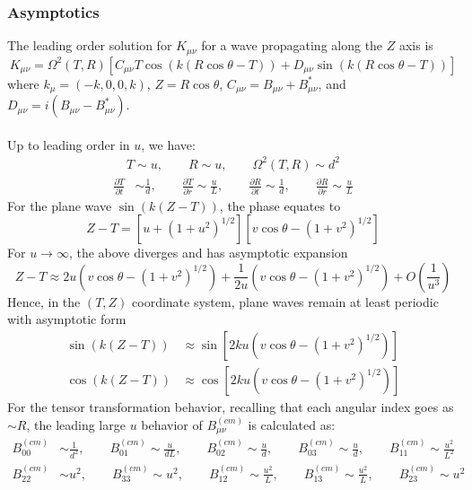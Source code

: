 \documentclass[10pt,letterpaper]{article}
\begin{document}
\subsubsection*{Asymptotics}
The leading order solution for $K_{\mu\nu}$ for a wave propagating along the $Z$ axis is
\begin{equation}
K_{\mu\nu} = \Omega^2(T,R)\left[ C_{\mu\nu} T \cos(k(R\cos\theta - T)) + D_{\mu\nu} \sin(k(R\cos\theta - T)) \right]
\end{equation}
where $k_{\mu} = (-k,0,0,k)$, $Z = R\cos\theta$, $C_{\mu\nu} = B_{\mu\nu}+B^*_{\mu\nu} $, and $D_{\mu\nu} = i(B_{\mu\nu}-B^*_{\mu\nu})$.
\\ \\
Up to leading order in $u$, we have:
\begin{align}
T\sim u,\qquad R \sim u,\qquad \Omega^2(T,R) \sim d^2
\end{align}
\begin{align}
\frac{\partial T}{\partial t} & \sim \frac{1}{d},\qquad
\frac{\partial T}{\partial r}  \sim 	\frac{u}{L},\qquad
\frac{\partial R}{\partial t}  \sim \frac{1}{d},\qquad
\frac{\partial R}{\partial r}  \sim \frac{u}{L}
\end{align}
For the plane wave $\sin(k(Z-T))$, the phase equates to
\begin{equation}
Z-T = \left[u+(1+u^2)^{1/2}\right]\left[v\cos\theta - ( 1+v^2)^{1/2}\right]
\end{equation}
For $u \to \infty$, the above diverges and has asymptotic expansion
\begin{equation}
Z-T \approx 2 u \left( v\cos\theta - (1+v^2)^{1/2}\right) + \frac{1}{2u}\left( v\cos\theta - (1+v^2)^{1/2}\right) + O\left( \frac{1}{u^3}\right)
\end{equation}
Hence, in the $(T,Z)$ coordinate system, plane waves remain at least periodic with asymptotic form
\begin{align}
\sin(k(Z-T)) &\approx \sin\left[ 2 k u \left( v\cos\theta - (1+v^2)^{1/2}\right)\right]\nonumber\\
\cos(k(Z-T)) &\approx \cos\left[ 2 k u \left( v\cos\theta - (1+v^2)^{1/2}\right)\right]
\end{align}
For the tensor transformation behavior, recalling that each angular index goes as $\sim R$, the leading large $u$ behavior of $B_{\mu\nu}^{(cm)}$ is calculated as:
\begin{align}
B^{(cm)}_{00} &\sim \frac{1}{d^2},\qquad 
B^{(cm)}_{01} \sim \frac{u}{dL},\qquad 
B^{(cm)}_{02} \sim \frac{u}{d},\qquad 
B^{(cm)}_{03} \sim \frac{u}{d} ,\qquad 
B^{(cm)}_{11} \sim \frac{u^2}{L^2} \nonumber\\
B^{(cm)}_{22} &\sim u^2 ,\qquad 
B^{(cm)}_{33} \sim u^2 ,\qquad 
B^{(cm)}_{12} \sim \frac{u^2}{L} ,\qquad 
B^{(cm)}_{13} \sim \frac{u^2}{L} ,\qquad 
B^{(cm)}_{23} \sim u^2
\end{align}
\end{document}
